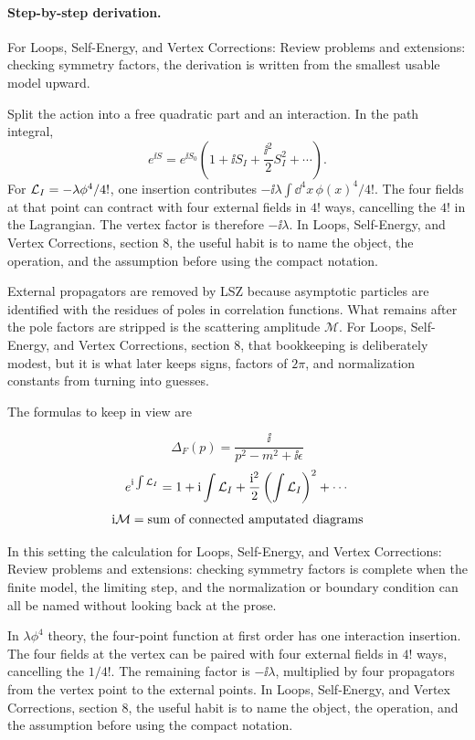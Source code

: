 \paragraph{Step-by-step derivation.}

For Loops, Self-Energy, and Vertex Corrections: Review problems and extensions: checking symmetry factors, the derivation is written from the smallest usable model upward.

Split the action into a free quadratic part and an interaction.  In the path integral,
\[
  e^{\ii S}=e^{\ii S_0}\left(1+\ii S_I+\frac{\ii^2}{2}S_I^2+\cdots\right).
\]
For \(\mathcal L_I=-\lambda\phi^4/4!\), one insertion contributes \(-\ii\lambda\int\dd^4x\,\phi(x)^4/4!\).  The four fields at that point can contract with four external fields in \(4!\) ways, cancelling the \(4!\) in the Lagrangian.  The vertex factor is therefore \(-\ii\lambda\).  In Loops, Self-Energy, and Vertex Corrections, section 8, the useful habit is to name the object, the operation, and the assumption before using the compact notation.

External propagators are removed by LSZ because asymptotic particles are identified with the residues of poles in correlation functions.  What remains after the pole factors are stripped is the scattering amplitude \(\mathcal M\).  For Loops, Self-Energy, and Vertex Corrections, section 8, that bookkeeping is deliberately modest, but it is what later keeps signs, factors of \(2\pi\), and normalization constants from turning into guesses.

The formulas to keep in view are

\[
  \Delta_F(p)=\frac{\ii}{p^2-m^2+\ii\epsilon}
\]
\[
  e^{\mathrm i\int\mathcal L_I}=1+\mathrm i\int\mathcal L_I+\frac{\mathrm i^2}{2}\left(\int\mathcal L_I\right)^2+\cdots
\]
\[
  \mathrm i\mathcal M=\hbox{sum of connected amputated diagrams}
\]

In this setting the calculation for Loops, Self-Energy, and Vertex Corrections: Review problems and extensions: checking symmetry factors is complete when the finite model, the limiting step, and the normalization or boundary condition can all be named without looking back at the prose.




\begin{example}
In \(\lambda\phi^4\) theory, the four-point function at first order has one interaction insertion.  The four fields at the vertex can be paired with four external fields in \(4!\) ways, cancelling the \(1/4!\).  The remaining factor is \(-\ii\lambda\), multiplied by four propagators from the vertex point to the external points.  In Loops, Self-Energy, and Vertex Corrections, section 8, the useful habit is to name the object, the operation, and the assumption before using the compact notation.
\end{example}



